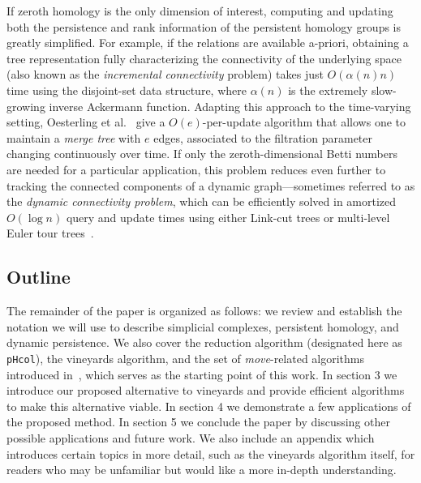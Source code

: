 \documentclass{siamart190516}
\begin{document}
If  zeroth homology is the only dimension of interest, computing and updating both the persistence and rank information of the persistent homology groups is greatly simplified. For example, if the relations are available a-priori, obtaining a tree representation fully characterizing the connectivity of the underlying space (also known as the \emph{incremental connectivity} problem) takes just $O(\alpha(n) n)$ time using the disjoint-set data structure, where $\alpha(n)$ is the extremely slow-growing inverse Ackermann function. 
Adapting this approach to the time-varying setting, Oesterling et al.~\cite{oesterling2015computing} give a $O(e)$-per-update algorithm that allows one to maintain a \emph{merge tree} with $e$ edges,
associated to the filtration parameter changing continuously over time. 
If only the zeroth-dimensional Betti numbers are needed for a particular application, this problem reduces even further to tracking the connected components of a dynamic graph---sometimes referred to as the \emph{dynamic connectivity problem}, which can be efficiently  solved in amortized $O(\log n)$ query and update times using either Link-cut trees or multi-level Euler tour trees~\cite{kapron2013dynamic}.

\subsection{Outline} The remainder of the paper is organized as follows: we review and establish the notation we will use to describe simplicial complexes, persistent homology, and dynamic persistence. We also cover the reduction algorithm (designated here as \texttt{pHcol}), the vineyards algorithm, and the set of \emph{move}-related algorithms introduced in~\cite{busaryev2010tracking}, which serves as the starting point of this work. 
In section 3 we introduce our proposed alternative to vineyards and provide efficient algorithms to make this alternative viable. 
In section 4 we demonstrate a few applications of the proposed method. In section 5 we conclude the paper by discussing other possible applications and future work. 
We also include an appendix which introduces certain topics in more detail, such as the vineyards algorithm itself, for readers who may be unfamiliar but would like a more in-depth understanding.


\end{document}
